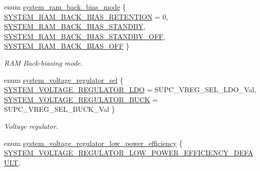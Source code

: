 \begin{DoxyCompactItemize}
enum \hyperlink{group__asfdoc__sam0__system__group_ga27a2c6a3d0366e83663283710aadd543}{system\+\_\+ram\+\_\+back\+\_\+bias\+\_\+mode} \{ \hyperlink{group__asfdoc__sam0__system__group_gga27a2c6a3d0366e83663283710aadd543a7bcbf5ea037337a5f421c57b05903c45}{S\+Y\+S\+T\+E\+M\+\_\+\+R\+A\+M\+\_\+\+B\+A\+C\+K\+\_\+\+B\+I\+A\+S\+\_\+\+R\+E\+T\+E\+N\+T\+I\+O\+N} = 0, 
\hyperlink{group__asfdoc__sam0__system__group_gga27a2c6a3d0366e83663283710aadd543ac9f3ee0336e73d4608ced9558f4abde7}{S\+Y\+S\+T\+E\+M\+\_\+\+R\+A\+M\+\_\+\+B\+A\+C\+K\+\_\+\+B\+I\+A\+S\+\_\+\+S\+T\+A\+N\+D\+B\+Y}, 
\hyperlink{group__asfdoc__sam0__system__group_gga27a2c6a3d0366e83663283710aadd543a5650cfc29e1185a89314c178a9836a1e}{S\+Y\+S\+T\+E\+M\+\_\+\+R\+A\+M\+\_\+\+B\+A\+C\+K\+\_\+\+B\+I\+A\+S\+\_\+\+S\+T\+A\+N\+D\+B\+Y\+\_\+\+O\+F\+F}, 
\hyperlink{group__asfdoc__sam0__system__group_gga27a2c6a3d0366e83663283710aadd543aca0a2bd1af74f60fd723bf3362857fb1}{S\+Y\+S\+T\+E\+M\+\_\+\+R\+A\+M\+\_\+\+B\+A\+C\+K\+\_\+\+B\+I\+A\+S\+\_\+\+O\+F\+F}
 \}
\begin{DoxyCompactList}\small\item\em R\+A\+M Back-\/biasing mode. \end{DoxyCompactList}\item 
enum \hyperlink{group__asfdoc__sam0__system__group_ga25dcee48e4c92abeee6351d1bc1b2e42}{system\+\_\+voltage\+\_\+regulator\+\_\+sel} \{ \hyperlink{group__asfdoc__sam0__system__group_gga25dcee48e4c92abeee6351d1bc1b2e42a7fbf348d20ce203d62ea66bfed9dad9c}{S\+Y\+S\+T\+E\+M\+\_\+\+V\+O\+L\+T\+A\+G\+E\+\_\+\+R\+E\+G\+U\+L\+A\+T\+O\+R\+\_\+\+L\+D\+O} = S\+U\+P\+C\+\_\+\+V\+R\+E\+G\+\_\+\+S\+E\+L\+\_\+\+L\+D\+O\+\_\+\+Val, 
\hyperlink{group__asfdoc__sam0__system__group_gga25dcee48e4c92abeee6351d1bc1b2e42a59a0a187cf734783f2cae265c5c61da4}{S\+Y\+S\+T\+E\+M\+\_\+\+V\+O\+L\+T\+A\+G\+E\+\_\+\+R\+E\+G\+U\+L\+A\+T\+O\+R\+\_\+\+B\+U\+C\+K} = S\+U\+P\+C\+\_\+\+V\+R\+E\+G\+\_\+\+S\+E\+L\+\_\+\+B\+U\+C\+K\+\_\+\+Val
 \}
\begin{DoxyCompactList}\small\item\em Voltage regulator. \end{DoxyCompactList}\item 
enum \hyperlink{group__asfdoc__sam0__system__group_ga07175f24498545cf119e3d514f13e2e7}{system\+\_\+voltage\+\_\+regulator\+\_\+low\+\_\+power\+\_\+efficiency} \{ \hyperlink{group__asfdoc__sam0__system__group_gga07175f24498545cf119e3d514f13e2e7a8cef476457bf84def2af2b9be4cadaee}{S\+Y\+S\+T\+E\+M\+\_\+\+V\+O\+L\+T\+A\+G\+E\+\_\+\+R\+E\+G\+U\+L\+A\+T\+O\+R\+\_\+\+L\+O\+W\+\_\+\+P\+O\+W\+E\+R\+\_\+\+E\+F\+F\+I\+C\+I\+E\+N\+C\+Y\+\_\+\+D\+E\+F\+A\+U\+L\+T}, 

\end{DoxyCompactItemize}
